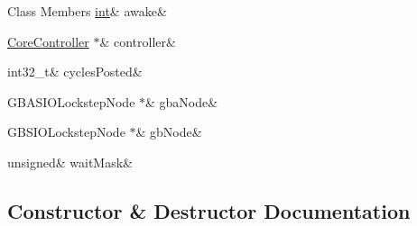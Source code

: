 \begin{DoxyFields}{Class Members}
\mbox{\label{class_q_g_b_a_1_1_multiplayer_controller_a1b160728e08c1c3d49763389e4e3e6f4}} 
\mbox{\hyperlink{ioapi_8h_a787fa3cf048117ba7123753c1e74fcd6}{int}}&
awake&
\\
\hline

\mbox{\label{class_q_g_b_a_1_1_multiplayer_controller_ad7f1e31ddaf69bdcc732a35ac37c5301}} 
\mbox{\hyperlink{class_q_g_b_a_1_1_core_controller}{CoreController}} $\ast$&
controller&
\\
\hline

\mbox{\label{class_q_g_b_a_1_1_multiplayer_controller_af8c0e259f062e145397c7d1482c5d47a}} 
int32\_t&
cyclesPosted&
\\
\hline

\mbox{\label{class_q_g_b_a_1_1_multiplayer_controller_ab89a42723f3e89365f30e1ec61f7b657}} 
GBASIOLockstepNode $\ast$&
gbaNode&
\\
\hline

\mbox{\label{class_q_g_b_a_1_1_multiplayer_controller_a49c9a2a5db7d7e636e018a844d201fb7}} 
GBSIOLockstepNode $\ast$&
gbNode&
\\
\hline

\mbox{\label{class_q_g_b_a_1_1_multiplayer_controller_af82e6e441f8f1199909495b6cb77da5f}} 
unsigned&
waitMask&
\\
\hline

\end{DoxyFields}


\subsection{Constructor \& Destructor Documentation}
\mbox{\label{class_q_g_b_a_1_1_multiplayer_controller_a2b20b2d598b93284d460940d13addd58}} 
